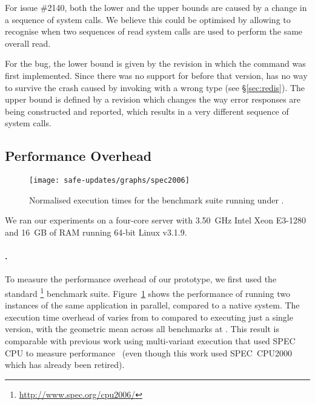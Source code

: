 For \lighttpd issue \#2140, both the lower and the upper bounds are
caused by a change in a sequence of  system calls.  We
believe this could be optimised by allowing \mx to recognise when two
sequences of read system calls are used to perform the same overall
read.


For the \redis bug, the lower bound is given by the revision in which the
 command was first implemented.  Since there was no support for
 before that version, \mx has no way to survive the crash caused
by invoking  with a wrong type (see \S\ref{sec:redis}).  The
upper bound is defined by a revision which changes the way error responses are
being constructed and reported, which results in a very different sequence of
system calls.



\subsection{Performance Overhead}
\label{sec:performance}

\begin{figure}[!t]
\centering
\texttt{[image: safe-updates/graphs/spec2006]}
\caption{Normalised execution times for the \spec benchmark suite running under
\mx.}
\label{fig:spec}
\end{figure}

We ran our experiments on a four-core server with 3.50~GHz Intel
Xeon E3-1280 and 16~GB of RAM running 64-bit Linux v3.1.9.

\paragraph{\spec.}
To measure the performance overhead of our prototype, we first used
the standard \spec\footnote{\url{http://www.spec.org/cpu2006/}}
benchmark suite.  Figure~\ref{fig:spec} shows the performance of \mx
running two instances of the same application in parallel, compared to
a native system. The execution time overhead of \mx varies
from \minOverSPEC to \maxOverSPEC compared to executing just a single
version, with the geometric mean across all \numSPECbench benchmarks at
\avgOverSPEC. This result is comparable with previous work using multi-variant
execution that used SPEC CPU to measure performance~\cite{orchestra09} (even
though this work used SPEC~CPU2000 which has already been retired).

